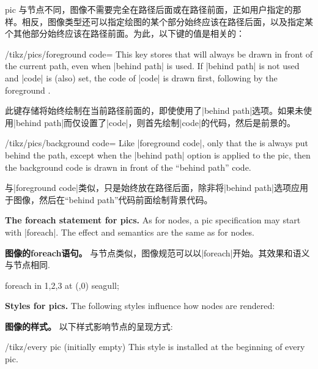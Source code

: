 \begin{pathoperation}{pic}
    与节点不同，图像不需要完全在路径后面或在路径前面，正如用户指定的那样。相反，图像类型还可以指定绘图的某个部分始终应该在路径后面，以及指定某个其他部分始终应该在路径前面。为此，以下键的值是相关的：

    \begin{key}{/tikz/pics/foreground code=}
        This key stores  that will always be drawn in front of the
        current path, even when |behind path| is used. If |behind path| is not
        used and |code| is (also) set, the code of |code| is drawn first,
        following by the foreground .

        此键存储将始终绘制在当前路径前面的，即使使用了|behind path|选项。如果未使用|behind path|而仅设置了|code|，则首先绘制|code|的代码，然后是前景的。
    \end{key}

    \begin{key}{/tikz/pics/background code=}
        Like |foreground code|, only that the  is always put behind
        the path, except when the |behind path| option is applied to the pic,
        then the background code is drawn in front of the ``behind path'' code.

        与|foreground code|类似，只是始终放在路径后面，除非将|behind path|选项应用于图像，然后在“behind path”代码前面绘制背景代码。
    \end{key}

    \medskip
    \textbf{The foreach statement for pics.}
    As for nodes, a pic specification may start with |foreach|. The effect and
    semantics are the same as for nodes.
    
    \textbf{图像的foreach语句。}
与节点类似，图像规范可以以|foreach|开始。其效果和语义与节点相同.
\begin{codeexample}[
    pre={\tikzset{
  seagull/.pic={
    \draw (-3mm,0) to [bend left] (0,0) to [bend left] (3mm,0);
  },
}}]
\tikz \pic foreach \x in {1,2,3} at (\x,0) {seagull};
\end{codeexample}

    \medskip
    \textbf{Styles for pics.}
    The following styles influence how nodes are rendered:

    \textbf{图像的样式。}
以下样式影响节点的呈现方式:
    \begin{stylekey}{/tikz/every pic (initially \normalfont empty)}
        This style is installed at the beginning of every pic.
        

\end{stylekey}
\end{pathoperation}
